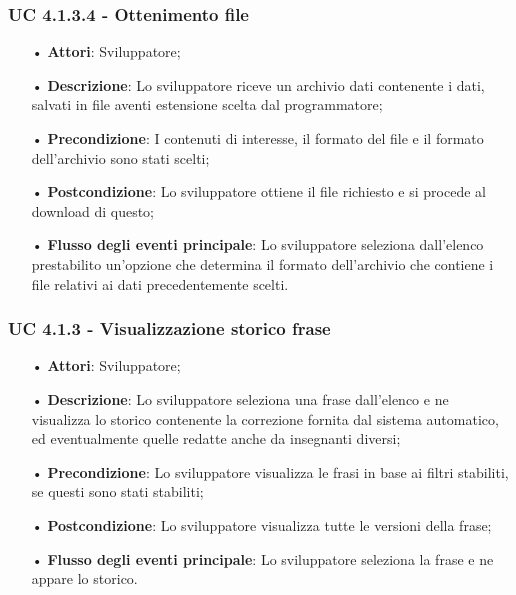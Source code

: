 \subsubsection{UC 4.1.3.4 - Ottenimento file}
\begin{itemize}
\item[•]\textbf{Attori}: Sviluppatore;
\item[•]\textbf{Descrizione}: Lo sviluppatore riceve un archivio dati contenente i dati, salvati in file aventi estensione scelta dal programmatore;
\item[•]\textbf{Precondizione}: I contenuti di interesse, il formato del file e il formato dell'archivio sono stati scelti;
\item[•]\textbf{Postcondizione}: Lo sviluppatore ottiene il file richiesto e si procede al download di questo;
\item[•]\textbf{Flusso degli eventi principale}:  Lo sviluppatore seleziona dall'elenco prestabilito un'opzione che determina il formato dell'archivio che contiene i file relativi ai dati precedentemente scelti.
\end{itemize}


\subsubsection{UC 4.1.3 - Visualizzazione storico frase}
\begin{itemize}
\item[•]\textbf{Attori}: Sviluppatore;
\item[•]\textbf{Descrizione}: Lo sviluppatore seleziona una frase dall'elenco e ne visualizza lo storico contenente la correzione fornita dal sistema automatico, ed eventualmente quelle redatte anche da insegnanti diversi;
\item[•]\textbf{Precondizione}:  Lo sviluppatore visualizza le frasi in base ai filtri stabiliti, se questi sono stati stabiliti;
\item[•]\textbf{Postcondizione}: Lo sviluppatore visualizza tutte le versioni della frase;
\item[•]\textbf{Flusso degli eventi principale}: Lo sviluppatore seleziona la frase e ne appare lo storico.
\end{itemize}


